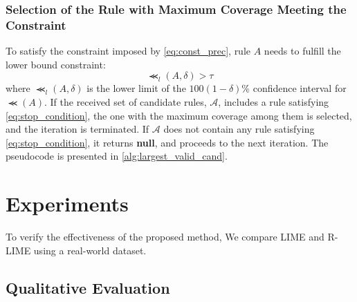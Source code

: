 \documentclass[runningheads]{llncs}
\begin{document}
\subsubsection{Selection of the Rule with Maximum Coverage Meeting the Constraint}
To satisfy the constraint imposed by \cref{eq:const_prec}, rule $A$ needs to fulfill the lower bound constraint:
\begin{equation}
	\Prec_{l}(A,\delta)>\tau
	\label{eq:stop_condition}
\end{equation}
where $\Prec_{l}(A,\delta)$ is the lower limit of
the $100(1-\delta)$\% confidence interval for $\Prec(A)$.
If the received set of candidate rules, $\mathcal{A}$,
includes a rule satisfying \cref{eq:stop_condition},
the one with the maximum coverage among them is selected,
and the iteration is terminated.
If $\mathcal{A}$ does not contain any rule satisfying \cref{eq:stop_condition},
it returns \textbf{null},
and proceeds to the next iteration.
The pseudocode is presented in \cref{alg:largest_valid_cand}.


\section{Experiments}
To verify the effectiveness of the proposed method,
We compare LIME and R-LIME using a real-world dataset.

\subsection{Qualitative Evaluation}
\end{document}
